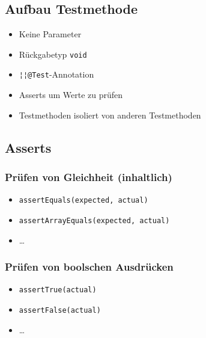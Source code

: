 \subsection{Aufbau Testmethode}

\begin{itemize}
    \item Keine Parameter
    \item Rückgabetyp \lstinline{void}
    \item \lstinline{¦¦@Test}-Annotation
    \item Asserts um Werte zu prüfen
    \item Testmethoden isoliert von anderen Testmethoden
\end{itemize}

\subsection{Asserts}
\begin{minipage}[t]{0.54\columnwidth}
    \subsubsection{Prüfen von Gleichheit (inhaltlich)}
    \begin{itemize}
        \item \lstinline{assertEquals(expected, actual)}
        \item \lstinline{assertArrayEquals(expected, actual)}
        \item \ldots
    \end{itemize}
\end{minipage}\hfill%
\begin{minipage}[t]{0.45\columnwidth}
    \subsubsection{Prüfen von boolschen Ausdrücken}
    \begin{itemize}
        \item \lstinline{assertTrue(actual)}
        \item \lstinline{assertFalse(actual)}
        \item \ldots
    \end{itemize}
\end{minipage}

